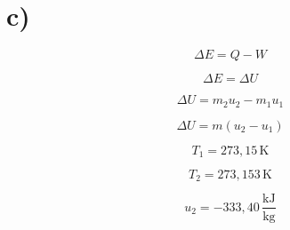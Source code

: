 

\section*{c)}

\[
\Delta E = Q - W
\]

\[
\Delta E = \Delta U
\]

\[
\Delta U = m_2 u_2 - m_1 u_1
\]

\[
\Delta U = m (u_2 - u_1)
\]

\[
T_1 = 273,15 \, \text{K}
\]

\[
T_2 = 273,153 \, \text{K}
\]

\[
u_2 = -333,40 \, \frac{\text{kJ}}{\text{kg}}
\]